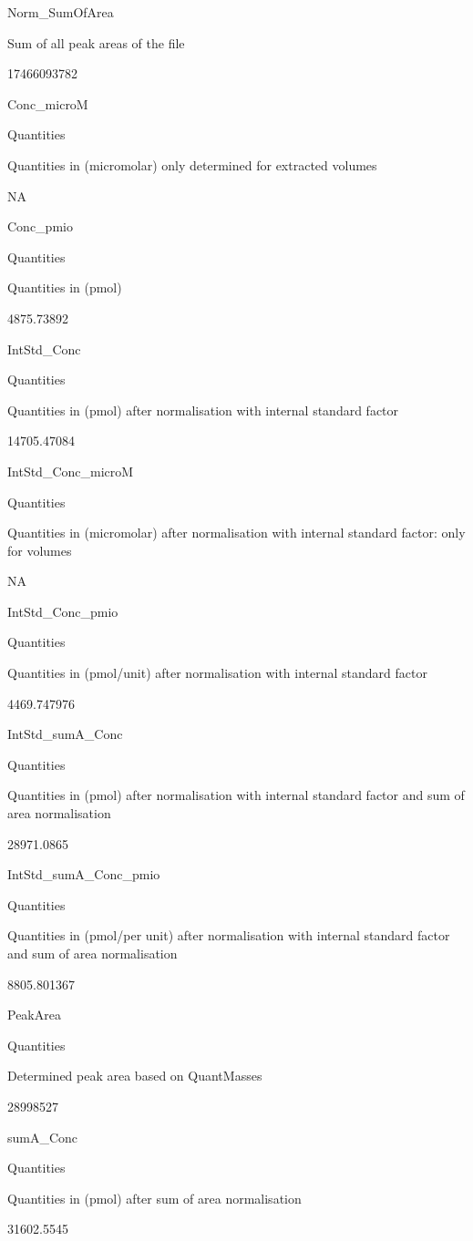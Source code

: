 \documentclass[]{book}
\theoremstyle{definition}
\theoremstyle{definition}
\theoremstyle{definition}
\theoremstyle{remark}
\begin{document}
Norm\_SumOfArea

Sum of all peak areas of the file

17466093782

Conc\_microM

Quantities

Quantities in (micromolar) only determined for extracted volumes

NA

Conc\_pmio

Quantities

Quantities in (pmol)

4875.73892

IntStd\_Conc

Quantities

Quantities in (pmol) after normalisation with internal standard factor

14705.47084

IntStd\_Conc\_microM

Quantities

Quantities in (micromolar) after normalisation with internal standard
factor: only for volumes

NA

IntStd\_Conc\_pmio

Quantities

Quantities in (pmol/unit) after normalisation with internal standard
factor

4469.747976

IntStd\_sumA\_Conc

Quantities

Quantities in (pmol) after normalisation with internal standard factor
and sum of area normalisation

28971.0865

IntStd\_sumA\_Conc\_pmio

Quantities

Quantities in (pmol/per unit) after normalisation with internal standard
factor and sum of area normalisation

8805.801367

PeakArea

Quantities

Determined peak area based on QuantMasses

28998527

sumA\_Conc

Quantities

Quantities in (pmol) after sum of area normalisation

31602.5545
\end{document}
